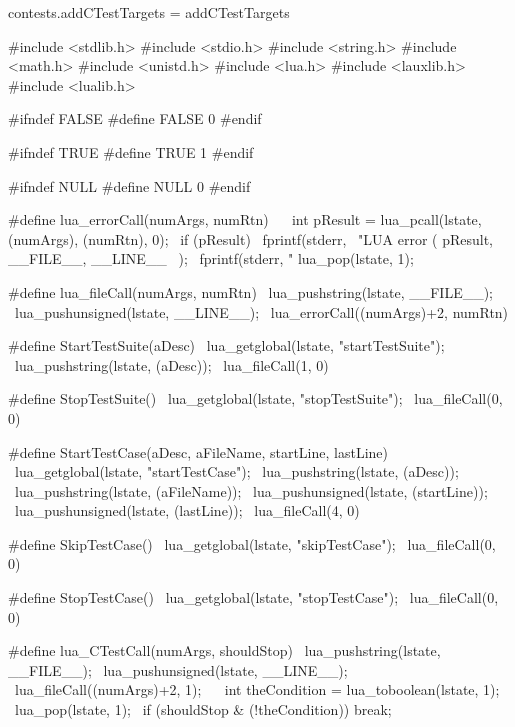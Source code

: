 contests.addCTestTargets = addCTestTargets
\stopLuaCode

\startCHeader
#include <stdlib.h>
#include <stdio.h>
#include <string.h>
#include <math.h>
#include <unistd.h>
#include <lua.h>
#include <lauxlib.h>
#include <lualib.h>

#ifndef FALSE
#define FALSE 0
#endif

#ifndef TRUE
#define TRUE 1
#endif

#ifndef NULL
#define NULL 0
#endif

#define lua_errorCall(numArgs, numRtn)                     \
{                                                          \
  int pResult = lua_pcall(lstate, (numArgs), (numRtn), 0); \
  if (pResult) {                                           \
    fprintf(stderr,                                        \
      "LUA error (%
      pResult, __FILE__, __LINE__                          \
    );                                                     \
    fprintf(stderr, "%
    lua_pop(lstate, 1);                                    \
  }                                                        \
}

#define lua_fileCall(numArgs, numRtn)            \
  lua_pushstring(lstate, __FILE__);              \
  lua_pushunsigned(lstate, __LINE__);            \
  lua_errorCall((numArgs)+2, numRtn)

#define StartTestSuite(aDesc)              \
  lua_getglobal(lstate, "startTestSuite"); \
  lua_pushstring(lstate, (aDesc));         \
  lua_fileCall(1, 0)

#define StopTestSuite()                   \
  lua_getglobal(lstate, "stopTestSuite"); \
  lua_fileCall(0, 0)

#define StartTestCase(aDesc, aFileName, startLine, lastLine) \
  lua_getglobal(lstate, "startTestCase");                    \
  lua_pushstring(lstate, (aDesc));                           \
  lua_pushstring(lstate, (aFileName));                       \
  lua_pushunsigned(lstate, (startLine));                     \
  lua_pushunsigned(lstate, (lastLine));                      \
  lua_fileCall(4, 0)

#define SkipTestCase()                   \
  lua_getglobal(lstate, "skipTestCase"); \
  lua_fileCall(0, 0)

#define StopTestCase()                   \
  lua_getglobal(lstate, "stopTestCase"); \
  lua_fileCall(0, 0)

#define lua_CTestCall(numArgs, shouldStop)       \
  lua_pushstring(lstate, __FILE__);              \
  lua_pushunsigned(lstate, __LINE__);            \
  lua_fileCall((numArgs)+2, 1);                  \
  {                                              \
    int theCondition = lua_toboolean(lstate, 1); \
    lua_pop(lstate, 1);                          \
    if (shouldStop & (!theCondition)) break;     \
  }
\stopCHeader


